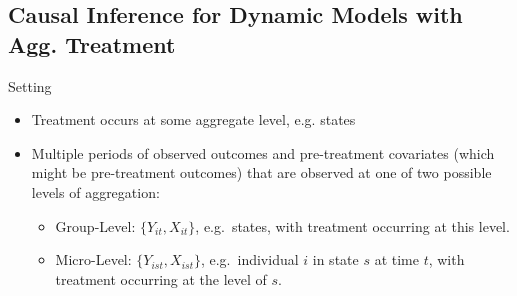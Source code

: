 \documentclass[12pt]{article}
\theoremstyle{plain}
\theoremstyle{definition}
\theoremstyle{remark}
\begin{document}
\clearpage
\subsection{%
  Causal Inference for Dynamic Models with Agg. Treatment
}

Setting
\begin{itemize}
  \item Treatment occurs at some aggregate level, e.g. states
  \item
    Multiple periods of observed outcomes and pre-treatment covariates
    (which might be pre-treatment outcomes) that are observed at one of
    two possible levels of aggregation:
    \begin{itemize}
      \item Group-Level: $\{Y_{it},X_{it}\}$, e.g.\ states,
        with treatment occurring at this level.
      \item Micro-Level: $\{Y_{ist},X_{ist}\}$, e.g.\ individual $i$ in
        state $s$ at time $t$, with treatment occurring at the level of
        $s$.
    \end{itemize}


\end{itemize}
\end{document}
